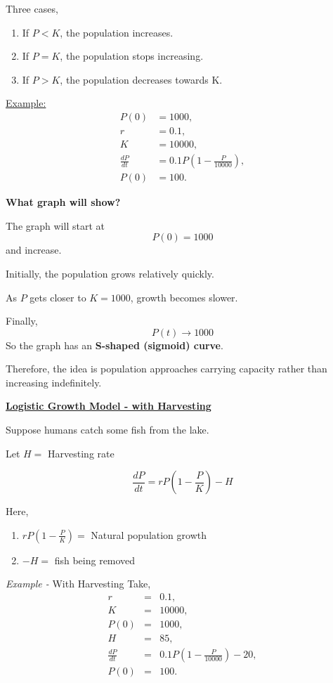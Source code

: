 \documentclass{article}
\begin{document}
Three cases,
\begin{enumerate}
    \item If $P < K$, the population increases. 
    \item If $P = K$, the population stops increasing.
    \item If $P > K$, the population decreases towards K.
\end{enumerate}

\underline{Example:}
\begin{align*}
    P(0) &= 1000, \\
    r &= 0.1, \\
    K &= 10000, \\
    \frac{dP}{dt} &= 0.1P\left(1 - \frac{P}{10000}\right), \\
    P(0) &= 100.
\end{align*}

\noindent
\textbf{What graph will show?}

\noindent
The graph will start at 
$$P(0) = 1000$$ and increase.

\noindent
Initially, the population grows relatively quickly. 

\noindent
As $P$ gets closer to $K = 1000$, growth becomes slower.

\noindent
Finally, $$P(t) \rightarrow 1000$$
So the graph has an \textbf{S-shaped (sigmoid) curve}. 

\noindent
Therefore, the idea is population approaches carrying capacity rather than increasing indefinitely.
\vspace{2em}

\begin{center}
    \textbf{\underline{Logistic Growth Model - with Harvesting}}
\end{center}

Suppose humans catch some fish from the lake.

Let $H = $ Harvesting rate

\[\frac{dP}{dt} = rP(1 - \frac{P}{K}) - H\]

Here,
\begin{enumerate}
    \item $rP(1 - \frac{P}{K}) =$ Natural population growth
    \item $-H =$ fish being removed 
\end{enumerate}


\textit{Example -} With Harvesting
Take,
\begin{eqnarray*}
    r &=& 0.1, \\
    K &=& 10000, \\
    P(0) &=& 1000, \\
    H &=& 85, \\
    \frac{dP}{dt} &=& 0.1P(1 - \frac{P}{10000}) - 20, \\
    P(0) &=& 100.
\end{eqnarray*}
\end{document}

